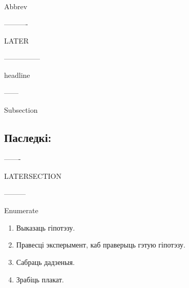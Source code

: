 Abbrev   

----------

LATER 

\later

---------------

headline


------

Subsection

\subsection{Паследкі:}

\pagebreak

-------

LATERSECTION  
\nopagebreak
{}

---------

Enumerate 

\begin{enumerate}[Крок 1:]\firmlist
    \item Выказаць гіпотэзу.
    \item Правесці эксперымент, каб праверыць гэтую гіпотэзу.
    \item Сабраць дадзеныя.
    \item Зрабіць плакат.
    \end{enumerate}




